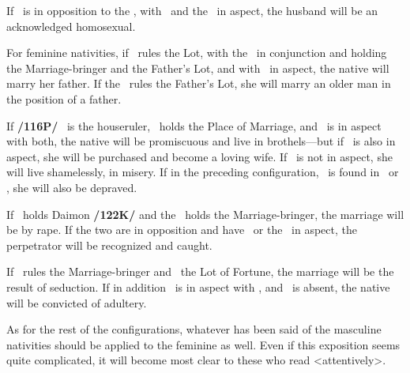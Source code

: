 If \Mars\, is in opposition to the \Moon, with \Saturn\, and the \Sun\, in aspect, the husband will be an acknowledged homosexual. 

For feminine nativities, if \Venus\, rules the Lot, with the \Sun\, in conjunction and holding the Marriage-bringer and the Father’s Lot, and with \Saturn\, in aspect, the native will marry her father. If the \Sun\, rules the Father’s Lot, she will marry an older man in the position of a father. 

If \textbf{/116P/} \Venus\, is the houseruler, \Mercury\, holds the Place of Marriage, and \Saturn\, is in aspect with both, the native will be
promiscuous and live in brothels—but if \Jupiter\, is also in aspect, she will be purchased and become a loving wife. If \Jupiter\, is not in aspect, she will live shamelessly, in misery.  If in the preceding configuration, \Venus\, is found in \Pisces\, or \Capricorn, she will also be depraved. 

If \Mars\, holds Daimon \textbf{/122K/} and the \Moon\, holds the Marriage-bringer, the marriage will be by rape. If the two are in opposition and have \Saturn\, or the \Sun\, in aspect, the perpetrator will be recognized and caught. 

If \Venus\, rules the Marriage-bringer and \Mars\, the Lot of Fortune, the marriage will be the result of seduction. If in addition \Saturn\, is in aspect with \Mercury, and \Jupiter\, is absent, the native will be convicted of adultery.

As for the rest of the configurations, whatever has been said of the masculine nativities should be applied to the feminine as well. Even if this exposition seems quite complicated, it will become most clear to these who read <attentively>.

\newpage